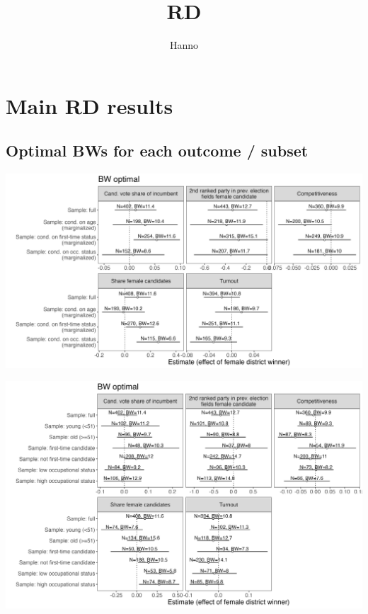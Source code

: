 \documentclass[
  letterpaper,
  DIV=11,
  numbers=noendperiod]{scrartcl}
\title{RD}
\author{Hanno}
\date{}
\begin{document}
\maketitle
\ifdefined\Shaded\renewenvironment{Shaded}{\begin{tcolorbox}[frame hidden, breakable, borderline west={3pt}{0pt}{shadecolor}, interior hidden, boxrule=0pt, sharp corners, enhanced]}{\end{tcolorbox}}\fi

\hypertarget{main-rd-results}{%
\section{Main RD results}\label{main-rd-results}}

\hypertarget{optimal-bws-for-each-outcome-subset}{%
\subsection{Optimal BWs for each outcome /
subset}\label{optimal-bws-for-each-outcome-subset}}

\includegraphics{images/Res_GER_Districts_marg.png}

\includegraphics{images/Res_GER_Districts_cond.png}
\end{document}
